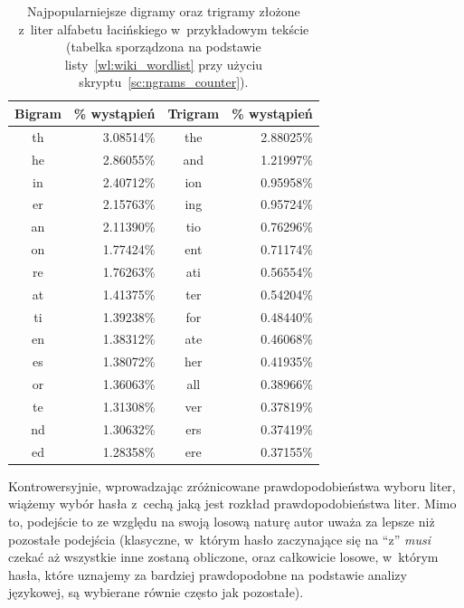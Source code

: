 \documentclass[12pt,a4paper,twoside]{article}
\begin{document}
\begin{myenumerate}
    \pagebreak
    \begin{table}[htb]
        \caption{Najpopularniejsze digramy oraz trigramy złożone z~liter alfabetu
        łacińskiego w~przykładowym tekście (tabelka sporządzona na podstawie
        listy~\ref{wl:wiki_wordlist} przy użyciu skryptu~\ref{sc:ngrams_counter}).}
        \label{tbl:english_letter_frequencies}
        \begin{tabular}{|c|r||c|r|}
            \hline
            Bigram & \small \% wystąpień &
            Trigram & \small \% wystąpień \\
            \hline
            th & 3.08514\% & the & 2.88025\% \\
            he & 2.86055\% & and & 1.21997\% \\
            in & 2.40712\% & ion & 0.95958\% \\
            er & 2.15763\% & ing & 0.95724\% \\
            an & 2.11390\% & tio & 0.76296\% \\
            on & 1.77424\% & ent & 0.71174\% \\
            re & 1.76263\% & ati & 0.56554\% \\
            at & 1.41375\% & ter & 0.54204\% \\
            ti & 1.39238\% & for & 0.48440\% \\
            en & 1.38312\% & ate & 0.46068\% \\
            es & 1.38072\% & her & 0.41935\% \\
            or & 1.36063\% & all & 0.38966\% \\
            te & 1.31308\% & ver & 0.37819\% \\
            nd & 1.30632\% & ers & 0.37419\% \\
            ed & 1.28358\% & ere & 0.37155\% \\
            \hline
        \end{tabular}
    \end{table}

    Kontrowersyjnie, wprowadzając zróżnicowane prawdopodobieństwa wyboru liter,
    wiążemy wybór hasła z~cechą jaką jest rozkład prawdopodobieństwa liter.
    Mimo to, podejście to ze względu na swoją losową naturę autor uważa za
    lepsze niż pozostałe podejścia (klasyczne, w~którym hasło zaczynające się
    na ``z'' \emph{musi} czekać aż wszystkie inne zostaną obliczone, oraz
    całkowicie losowe, w~którym hasła, które uznajemy za bardziej prawdopodobne
    na podstawie analizy językowej, są wybierane równie często jak pozostałe).


\end{myenumerate}
\end{document}
